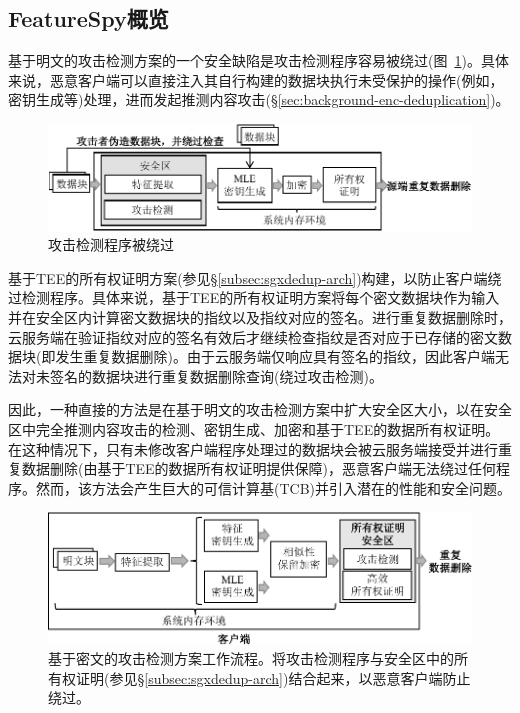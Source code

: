 \subsection{FeatureSpy概览}
\label{subsec:featurespy-secure_design}

基于明文的攻击检测方案的一个安全缺陷是攻击检测程序容易被绕过(图~\ref{fig:featurespy-architecture-strawman-bypass})。具体来说，恶意客户端可以直接注入其自行构建的数据块执行未受保护的操作(例如，密钥生成等)处理，进而发起推测内容攻击(\S\ref{sec:background-enc-deduplication})。

\begin{figure}[!htb]
    \centering
    \includegraphics[width=\textwidth]{pic/featurespy/naive-problem.pdf}
    \caption{攻击检测程序被绕过}
    \label{fig:featurespy-architecture-strawman-bypass}
\end{figure}


\sysnameF 基于TEE的所有权证明方案(参见\S\ref{subsec:sgxdedup-arch})构建，以防止客户端绕过检测程序。具体来说，基于TEE的所有权证明方案将每个密文数据块作为输入并在安全区内计算密文数据块的指纹以及指纹对应的签名。进行重复数据删除时，云服务端在验证指纹对应的签名有效后才继续检查指纹是否对应于已存储的密文数据块(即发生重复数据删除)。由于云服务端仅响应具有签名的指纹，因此客户端无法对未签名的数据块进行重复数据删除查询(绕过攻击检测)。

因此，一种直接的方法是在基于明文的攻击检测方案中扩大安全区大小，以在安全区中完全推测内容攻击的检测、密钥生成、加密和基于TEE的数据所有权证明。在这种情况下，只有未修改客户端程序处理过的数据块会被云服务端接受并进行重复数据删除(由基于TEE的数据所有权证明提供保障)，恶意客户端无法绕过任何程序。然而，该方法会产生巨大的可信计算基(TCB)并引入潜在的性能和安全问题。

\begin{figure}[!htb]
    \centering
    \includegraphics[width=\textwidth]{pic/featurespy/architecture.pdf}
    \caption{基于密文的攻击检测方案工作流程。\sysnameF 将攻击检测程序与安全区中的所有权证明(参见\S\ref{subsec:sgxdedup-arch})结合起来，以恶意客户端防止绕过。}
    \label{fig:featurespy-architecture-secure}
\end{figure}

